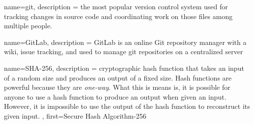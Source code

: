 {
	name={git},
	description ={
			the most popular version control system used for tracking changes in source code and coordinating work on those files among multiple people.
	}
}


{
	name={GitLab},
	description ={
		GitLab is an online Git repository manager with a wiki, issue tracking, and used to manage \gls{git} repositories on a centralized server
	}
}

{
	name={SHA-256},
	description ={
		cryptographic hash function that takes an input of a random size and produces an output of a fixed size. Hash functions are powerful because they are \textit{one-way}. What this is means is, it is possible for anyone to use a hash function to produce an output when given an input. However, it is impossible to use the output of the hash function to reconstruct its given input.
	},
	first={Secure Hash Algorithm-256}
}
